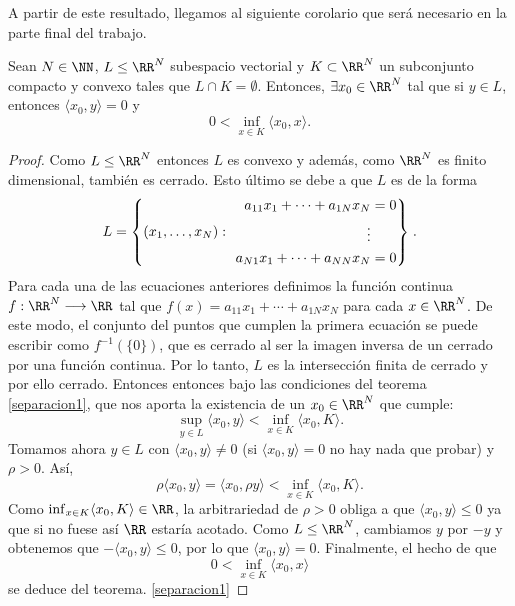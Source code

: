 A partir de este resultado, llegamos al siguiente corolario que será necesario en la parte final del trabajo.

\begin{corolarioBox}
Sean $ N \in \NN $, $ L \leq \RR^N $ subespacio vectorial y $ K \subset \RR^N $ un subconjunto compacto y convexo tales que $ L \cap K = \emptyset $. Entonces, $ \exists x_0 \in \RR^N $ tal que si $ y \in L $, entonces $ \langle x_0, y\rangle = 0 $ y 
\[
0 < \inf_{ x \in K} \langle x_0, x\rangle.
\]
\end{corolarioBox} 
\begin{proof}
Como $ L \leq \RR^N $ entonces $ L $ es convexo y además, como $ \RR^N $ es finito dimensional, también es cerrado. Esto último se debe a que $ L $ es de la forma
\begin{equation*}
L = \left\{(x_1,\dots,x_N):\hspace{1mm}
\begin{rcases}
\begin{split}
a_{11}x_1+\cdots+a_{1N}x_N &= 0 \\
\vdots \\
a_{N1}x_1+\cdots+a_{NN}x_N &= 0
\end{split}
\end{rcases} \right. .
\end{equation*}
Para cada una de las ecuaciones anteriores definimos la función continua $ f:\RR^N \longrightarrow \RR $ tal que $ f(x) = a_{11}x_1+\cdots+a_{1N}x_N$ para cada $ x \in \RR^N $. De este modo, el conjunto del puntos que cumplen la primera ecuación se puede escribir como $ f^{-1}(\{0\}) $, que es cerrado al ser la imagen inversa de un cerrado por una función continua. Por lo tanto, $ L $ es la intersección finita de cerrado y por ello cerrado. Entonces entonces bajo las condiciones del teorema \ref{separacion1}, que nos aporta la existencia de un $ x_0 \in \RR^N $ que cumple:
\[
\sup_{y \in L} \langle x_0,y\rangle < \inf_{x\in K} \langle x_0,K\rangle.
\]
Tomamos ahora $ y \in L $ con $ \langle x_0,y\rangle \neq 0 $ (si $ \langle x_0,y\rangle = 0$ no hay nada que probar) y $ \rho > 0 $. Así,
\[
\rho \langle x_0,y\rangle = \langle x_0,\rho y\rangle < \inf_{x\in K} \langle x_0,K\rangle.
\]
Como $ \inf_{x\in K} \langle x_0,K\rangle \in \RR $, la arbitrariedad de $ \rho > 0 $ obliga a que $ \langle x_0,y\rangle \leq 0$ ya que si no fuese así $ \RR $ estaría acotado. Como $ L \leq \RR^N$, cambiamos $ y $ por $ -y $ y obtenemos que $ -\langle x_0,y\rangle \leq 0 $, por lo que $ \langle x_0,y\rangle = 0 $. Finalmente, el hecho de que 
\[
0 < \inf_{ x \in K} \langle x_0, x\rangle
\]
se deduce del teorema. \ref{separacion1}
\end{proof}


